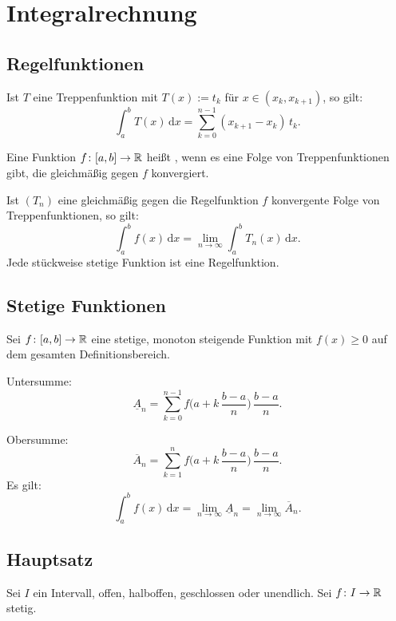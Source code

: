 \section{Integralrechnung}
\subsection{Regelfunktionen}
Ist $T$ eine Treppenfunktion
mit $T(x):=t_k$ für $x\in(x_k,x_{k+1})$,
so gilt:
\begin{equation}
\int_a^b T(x)\,\mathrm dx = \sum_{k=0}^{n-1} (x_{k+1}-x_k)\,t_k.
\end{equation}
\begin{definition}[Regelfunktion]
Eine Funktion $f\colon[a,b]\to\mathbb R$ heißt
, wenn es eine
Folge von Treppenfunktionen gibt, die gleichmäßig gegen $f$
konvergiert.
\end{definition}

Ist $(T_n)$ eine gleichmäßig gegen die Regelfunktion $f$ konvergente
Folge von Treppenfunktionen, so gilt:
\begin{equation}
\int_a^b f(x)\,\mathrm dx = \lim_{n\to\infty} \int_a^b T_n(x)\,\mathrm dx.
\end{equation}
Jede stückweise stetige Funktion ist eine Regelfunktion.

\subsection{Stetige Funktionen}
Sei $f\colon [a,b]\to\mathbb R$ eine stetige, monoton steigende
Funktion mit $f(x)\ge 0$ auf dem gesamten Definitionsbereich.

Untersumme:
\begin{equation}
\underline{A}_n = \sum_{k=0}^{n-1}
f\Big(a+k\,\frac{b-a}{n}\Big)\,\frac{b-a}{n}.
\end{equation}

Obersumme:
\begin{equation}
\overline{A}_n = \sum_{k=1}^{n}
f\Big(a+k\,\frac{b-a}{n}\Big)\,\frac{b-a}{n}.
\end{equation}
Es gilt:
\begin{equation}
\int_a^b f(x)\,\mathrm dx
= \lim_{n\to\infty}\underline A_n
= \lim_{n\to\infty}\overline A_n.
\end{equation}

\subsection{Hauptsatz}
Sei $I$ ein Intervall, offen, halboffen, geschlossen oder unendlich.
Sei $f\colon I\to\mathbb R$ stetig.

